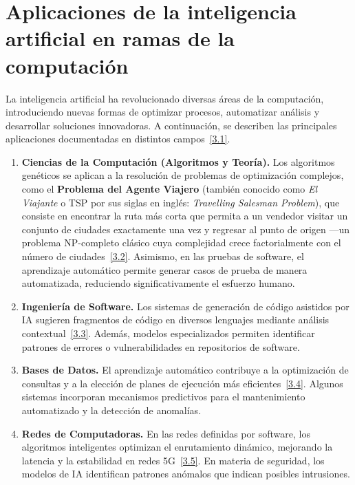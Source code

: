 \documentclass[12pt,a4paper]{report}
\numberwithin{figure}{section}
\begin{document}
\section[Aplicaciones de la IA en la computación]{Aplicaciones de la inteligencia artificial en ramas de la computación}
\label{sec:aplicaciones_ia}

La inteligencia artificial ha revolucionado diversas áreas de la computación, introduciendo nuevas formas de optimizar procesos, automatizar análisis y desarrollar soluciones innovadoras. A continuación, se describen las principales aplicaciones documentadas en distintos campos~\hyperref[ref:3.1]{[3.1]}.

\begin{enumerate}
    \item \textbf{Ciencias de la Computación (Algoritmos y Teoría).}  
    Los algoritmos genéticos se aplican a la resolución de problemas de optimización complejos, como el \textbf{Problema del Agente Viajero} (también conocido como \textit{El Viajante} o TSP por sus siglas en inglés: \textit{Travelling Salesman Problem}), que consiste en encontrar la ruta más corta que permita a un vendedor visitar un conjunto de ciudades exactamente una vez y regresar al punto de origen ---un problema NP-completo clásico cuya complejidad crece factorialmente con el número de ciudades~\hyperref[ref:3.2]{[3.2]}. Asimismo, en las pruebas de software, el aprendizaje automático permite generar casos de prueba de manera automatizada, reduciendo significativamente el esfuerzo humano.

    \item \textbf{Ingeniería de Software.}  
    Los sistemas de generación de código asistidos por IA sugieren fragmentos de código en diversos lenguajes mediante análisis contextual~\hyperref[ref:3.3]{[3.3]}. Además, modelos especializados permiten identificar patrones de errores o vulnerabilidades en repositorios de software.

    \item \textbf{Bases de Datos.}  
    El aprendizaje automático contribuye a la optimización de consultas y a la elección de planes de ejecución más eficientes~\hyperref[ref:3.4]{[3.4]}. Algunos sistemas incorporan mecanismos predictivos para el mantenimiento automatizado y la detección de anomalías.

    \item \textbf{Redes de Computadoras.}  
    En las redes definidas por software, los algoritmos inteligentes optimizan el enrutamiento dinámico, mejorando la latencia y la estabilidad en redes 5G~\hyperref[ref:3.5]{[3.5]}. En materia de seguridad, los modelos de IA identifican patrones anómalos que indican posibles intrusiones.


\end{enumerate}
\end{document}

